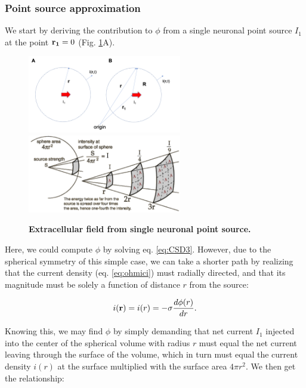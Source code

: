 \subsubsection{Point source approximation}
We start by deriving the contribution to $\phi$ from a single neuronal point source $I_1$ at the point ${\bf r_1}=0$ (Fig. \ref{VC:fig:pointsource}A). 

\begin{figure}[!ht]
\begin{center}
\includegraphics[width=0.6\textwidth]{Figures/VC/Pointsource.png}
\includegraphics[width=0.6\textwidth]{Figures/VC/pointsource_3D_illustration.png}
\end{center}
\caption{\textbf{Extracellular field from single neuronal point source.} 
}
\label{VC:fig:pointsource}
\end{figure}

Here, we could compute $\phi$ by solving eq. \ref{eq:CSD3}. However, due to the spherical symmetry of this simple case, we can take a shorter path by realizing that the current density (eq. \ref{eq:ohmici}) must radially directed, and that its magnitude must be solely a function of distance $r$ from the source:

\begin{equation}
i({\bf r}) = i(r) = -\sigma \frac{d\phi(r)}{dr}.
\end{equation}

Knowing this, we may find $\phi$ by simply demanding that net current $I_1$ injected into the center of the spherical volume with radius $r$ must equal the net current leaving through the surface of the volume, which in turn must equal the current density $i(r)$ at the surface multiplied with the surface area $4\pi r^2$. We then get the relationship:

